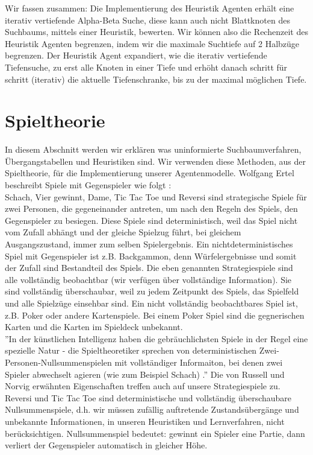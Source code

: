 Wir fassen zusammen: Die Implementierung des Heuristik Agenten erhält eine iterativ vertiefende Alpha-Beta Suche, diese kann auch nicht Blattknoten des Suchbaums, mittels einer Heuristik, bewerten. Wir können also die Rechenzeit des Heuristik Agenten begrenzen, indem wir die maximale Suchtiefe auf 2 Halbzüge begrenzen. Der Heuristik Agent expandiert, wie die iterativ vertiefende Tiefensuche, zu erst alle Knoten in einer Tiefe und erhöht danach schritt für schritt (iterativ) die aktuelle Tiefenschranke, bis zu der maximal möglichen Tiefe. 

\section{Spieltheorie}
\label{sec:Spieltheorie}
In diesem Abschnitt werden wir erklären was uninformierte Suchbaumverfahren, Übergangstabellen und Heuristiken sind. Wir verwenden diese Methoden, aus der Spieltheorie, für die Implementierung unserer Agentenmodelle. Wolfgang Ertel beschreibt Spiele mit Gegenspieler wie folgt \cite[114]{Ertel}: \\ 

Schach, Vier gewinnt, Dame, Tic Tac Toe und Reversi sind strategische Spiele für zwei Personen, die gegeneinander antreten, um nach den Regeln des Spiels, den Gegenspieler zu besiegen. Diese Spiele sind deterministisch, weil das Spiel nicht vom Zufall abhängt und der gleiche Spielzug führt, bei gleichem Ausgangszustand, immer zum selben Spielergebnis. Ein nichtdeterministisches Spiel mit Gegenspieler ist z.B. Backgammon, denn Würfelergebnisse und somit der Zufall sind Bestandteil des Spiels. Die eben genannten Strategiespiele sind alle vollständig beobachtbar (wir verfügen über vollständige Information). Sie sind vollständig überschaubar, weil zu jedem Zeitpunkt des Spiels, das Spielfeld und alle Spielzüge einsehbar sind. Ein nicht vollständig beobachtbares Spiel ist, z.B. Poker oder andere Kartenspiele. Bei einem Poker Spiel sind die gegnerischen Karten und die Karten im Spieldeck unbekannt.\\

''In der künstlichen Intelligenz haben die gebräuchlichsten Spiele in der Regel eine spezielle Natur - die Spieltheoretiker sprechen von deterministischen Zwei-Personen-Nullsummenspielen mit vollständiger Informaiton, bei denen zwei Spieler abwechselt agieren (wie zum Beispiel Schach) \cite[206]{Russell}.'' Die von Russell und Norvig erwähnten Eigenschaften treffen auch auf unsere Strategiespiele zu. Reversi und Tic Tac Toe sind deterministische und vollständig überschaubare Nullsummenspiele, d.h. wir müssen zufällig auftretende Zustandsübergänge und unbekannte Informationen, in unseren Heuristiken und Lernverfahren, nicht berücksichtigen. Nullsummenspiel bedeutet: gewinnt ein Spieler eine Partie, dann verliert der Gegenspieler automatisch in gleicher Höhe.












